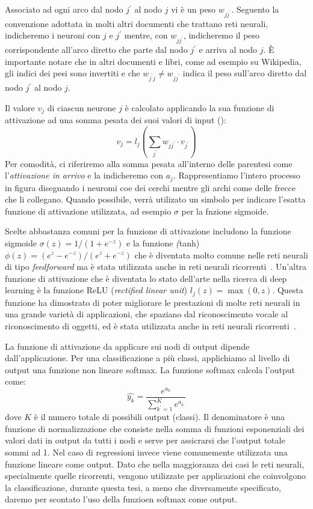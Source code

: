 Associato ad ogni arco dal nodo $j^{'}$ al nodo $j$ vi \`e un peso $w_{jj^{'}}$. Seguento la convenzione adottata in molti altri documenti che trattano reti neurali, indicheremo i neuroni con $j$ e $j^{'}$ mentre, con $w_{jj^{'}}$, indicheremo il peso corrispondente all'arco diretto che parte dal nodo $j^{'}$ e arriva al nodo $j$.
\`E importante notare che in altri documenti e libri, come ad esempio su Wikipedia, gli indici dei pesi sono invertiti e che $w_{j^{'}j} \neq w_{jj^{'}}$ indica il peso sull'arco diretto dal nodo $j^{'}$ al nodo $j$.

Il valore $v_j$ di ciascun neurone $j$ \`e calcolato applicando la sua funzione di attivazione ad una somma pesata dei suoi valori di input (): %
\begin{equation*}
  v_j = l_j\left( \sum_{j^{'}} w_{jj^{'}} \cdot v_{j^{'}} \right)
\end{equation*}
Per comodit\`a, ci riferiremo alla somma pesata all'interno delle parentesi come l'\emph{attivazione in arrivo} e la indicheremo con $a_j$. Rappresentiamo l'intero processo in figura disegnando i neuromi coe dei cerchi mentre gli archi come delle frecce che li collegano.
Quando possibile, verr\`a utilizato un simbolo per indicare l'esatta funzione di attivazione utilizzata, ad esempio $\sigma$ per la fnzione sigmoide.

Scelte abbastanza comuni per la funzione di attivazione includono la funzione sigmoide $\sigma(z) = 1/(1+e^{-z})$ e la funzione \emph(tanh) $\phi(z)=(e^z-e^{-z})/(e^z+e^{-z})$ che \`e diventata molto comune nelle reti neurali di tipo \emph{feedforward} ma \`e stata utilizzata anche in reti neurali ricorrenti~\cite{Sutskever:2011}.
Un'altra funzione di attivazione che \`e diventata lo stato dell'arte nella ricerca di deep learning \`e la funzione ReLU (\emph{rectified linear unit}) $l_j(z)=\operatorname{max}(0, z)$.
Questa funzione ha dimostrato di poter migliorare le prestazioni di molte reti neurali in una grande variet\`a di applicazioni, che spaziano dal riconoscimento vocale al riconoscimento di oggetti, ed \`e stata utilizzata anche in reti neurali ricorrenti~\cite{Bengio:2013}.

La funzione di attivazione da applicare sui nodi di output dipende dall'applicazione.
Per una classificazione a pi\`u classi, applichiamo al livello di output una funzione non lineare softmax.
La funzione softmax calcola l'output come:
\begin{equation*}
  \hat{y_k} = \frac{e^{a_k}}{\sum_{k^{'}=1}^{K} e^{a_{k^{'}}}}
\end{equation*}
dove $K$ \`e il numero totale di possibili output (classi). Il denominatore \`e una funzione di normalizzazione che consiste nella somma di funzioni esponenziali dei valori dati in output da tutti i nodi e serve per assicrarsi che l'output totale sommi ad 1.
Nel caso di regressioni invece viene comunemente utilizzata una funzione lineare come output.
Dato che nella maggioranza dei casi le reti neurali, specialmente quelle ricorrenti, vengono utilizzate per applicazioni che coinvolgono la classificazione, durante questa tesi, a meno che diversamente specificato, daremo per scontato l'uso della funzioen softmax come output.

